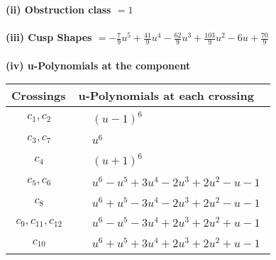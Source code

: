 \documentclass[1p]{elsarticle_modified}
\theoremstyle{definition}
\begin{document}
\flushleft \textbf{(ii) Obstruction class $= 1$}\\~\\
\flushleft \textbf{(iii) Cusp Shapes $= -\frac{7}{9} u^5+\frac{41}{9} u^4-\frac{62}{9} u^3+\frac{103}{9} u^2-6 u+\frac{70}{9}$}\\~\\
\newpage\renewcommand{\arraystretch}{1}
\flushleft \textbf{(iv) u-Polynomials at the component}\newline \\
\begin{tabular}{m{50pt}|m{274pt}}
Crossings & \hspace{64pt}u-Polynomials at each crossing \\
\hline $$\begin{aligned}c_{1},c_{2}\end{aligned}$$&$\begin{aligned}
&(u-1)^6
\end{aligned}$\\
\hline $$\begin{aligned}c_{3},c_{7}\end{aligned}$$&$\begin{aligned}
&u^6
\end{aligned}$\\
\hline $$\begin{aligned}c_{4}\end{aligned}$$&$\begin{aligned}
&(u+1)^6
\end{aligned}$\\
\hline $$\begin{aligned}c_{5},c_{6}\end{aligned}$$&$\begin{aligned}
&u^6- u^5+3 u^4-2 u^3+2 u^2- u-1
\end{aligned}$\\
\hline $$\begin{aligned}c_{8}\end{aligned}$$&$\begin{aligned}
&u^6+u^5-3 u^4-2 u^3+2 u^2- u-1
\end{aligned}$\\
\hline $$\begin{aligned}c_{9},c_{11},c_{12}\end{aligned}$$&$\begin{aligned}
&u^6- u^5-3 u^4+2 u^3+2 u^2+u-1
\end{aligned}$\\
\hline $$\begin{aligned}c_{10}\end{aligned}$$&$\begin{aligned}
&u^6+u^5+3 u^4+2 u^3+2 u^2+u-1
\end{aligned}$\\
\hline
\end{tabular}\\~\\
\end{document}
